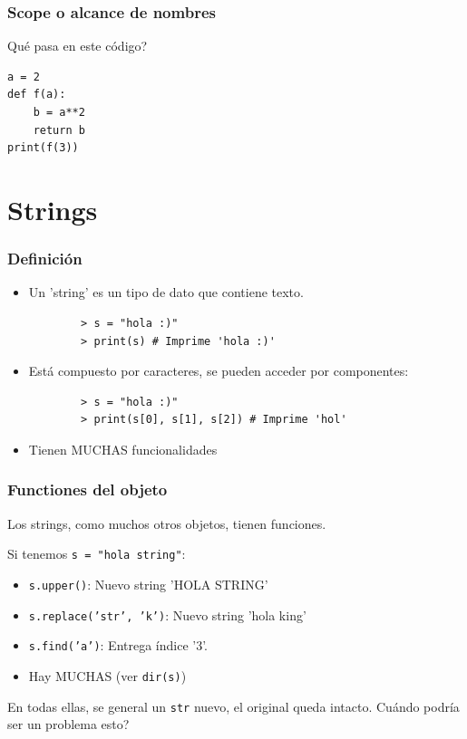 \documentclass[14pt,aspectratio=169,xcolor=dvipsnames]{beamer}
\begin{document}
\begin{frame}[fragile]\frametitle{Scope o alcance de nombres}
Qué pasa en este código?

\begin{verbatim}
a = 2
def f(a):
    b = a**2
    return b
print(f(3))
\end{verbatim}

\end{frame}
\section{Strings}
\begin{frame}[t,fragile]\frametitle{Definición}
    \begin{itemize} 
        \item<1-> Un 'string' es un tipo de dato que contiene texto. 
            \begin{verbatim}
        > s = "hola :)"
        > print(s) # Imprime 'hola :)'
            \end{verbatim}
        \item<2-> Está compuesto por caracteres, se pueden acceder por componentes: 
            \begin{verbatim}
        > s = "hola :)"
        > print(s[0], s[1], s[2]) # Imprime 'hol'
            \end{verbatim}
        \item<3-> Tienen MUCHAS funcionalidades
    \end{itemize}
\end{frame}
\begin{frame}\frametitle{Functiones del objeto}
    Los strings, como muchos otros objetos, tienen funciones. 

    Si tenemos \texttt{s = "hola string"}:
    \begin{itemize}
        \item \texttt{s.upper()}: Nuevo string 'HOLA STRING'
        \item \texttt{s.replace('str', 'k')}: Nuevo string 'hola king'
        \item \texttt{s.find('a')}: Entrega índice '3'.
        \item Hay MUCHAS (ver \texttt{dir(s)})
    \end{itemize}

En todas ellas, se general un \texttt{str} nuevo, el original queda intacto. Cuándo podría ser un problema esto? 
\end{frame}
\end{document}

